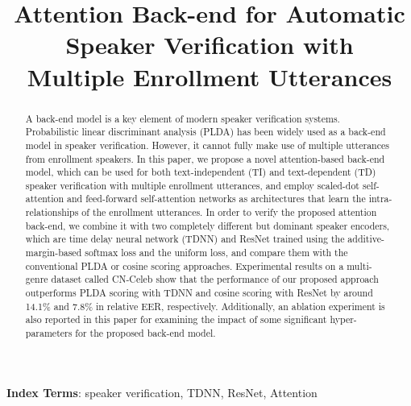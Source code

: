 \documentclass[a4paper]{article}
\title{Attention Back-end for Automatic Speaker Verification with \\ Multiple Enrollment Utterances}
\begin{document}
\maketitle
\begin{abstract}
A back-end model is a key element of modern speaker verification systems. Probabilistic linear discriminant analysis (PLDA) has been widely used as a back-end model in speaker verification. However, it cannot fully make use of multiple utterances from enrollment speakers. In this paper, we propose a novel attention-based back-end model, which can be used for both text-independent (TI) and text-dependent (TD) speaker verification with multiple enrollment utterances, and employ scaled-dot self-attention and feed-forward self-attention networks as architectures that learn the intra-relationships of the enrollment utterances.  
In order to verify the proposed attention back-end, 
we combine it with two completely different but dominant speaker encoders, which are time delay neural network (TDNN) and ResNet trained using the additive-margin-based softmax loss and the uniform loss, and compare them with the conventional PLDA or cosine scoring approaches. Experimental results on a multi-genre dataset called CN-Celeb show that the performance of our proposed approach outperforms PLDA scoring with TDNN and cosine scoring with ResNet by around 14.1\% and 7.8\% in relative EER, respectively. Additionally, an ablation experiment is also reported in this paper for examining the impact of some significant hyper-parameters for the proposed back-end model.
\end{abstract}
\noindent\textbf{Index Terms}: speaker verification, TDNN, ResNet, Attention    
\end{document}
